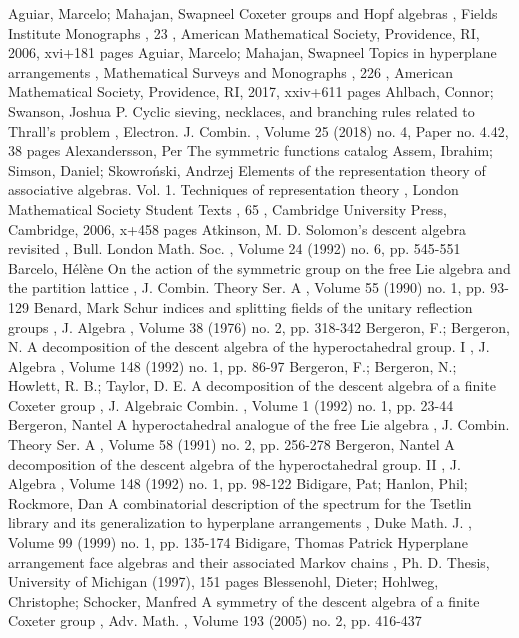  Aguiar, Marcelo; Mahajan, Swapneel Coxeter groups and Hopf algebras , Fields Institute Monographs , 23 , American Mathematical Society, Providence, RI, 2006, xvi+181 pages
 Aguiar, Marcelo; Mahajan, Swapneel Topics in hyperplane arrangements , Mathematical Surveys and Monographs , 226 , American Mathematical Society, Providence, RI, 2017, xxiv+611 pages
 Ahlbach, Connor; Swanson, Joshua P. Cyclic sieving, necklaces, and branching rules related to Thrall’s problem , Electron. J. Combin. , Volume 25 (2018) no. 4, Paper no. 4.42, 38 pages
 Alexandersson, Per The symmetric functions catalog
 Assem, Ibrahim; Simson, Daniel; Skowroński, Andrzej Elements of the representation theory of associative algebras. Vol. 1. Techniques of representation theory , London Mathematical Society Student Texts , 65 , Cambridge University Press, Cambridge, 2006, x+458 pages
 Atkinson, M. D. Solomon’s descent algebra revisited , Bull. London Math. Soc. , Volume 24 (1992) no. 6, pp. 545-551
 Barcelo, Hélène On the action of the symmetric group on the free Lie algebra and the partition lattice , J. Combin. Theory Ser. A , Volume 55 (1990) no. 1, pp. 93-129
 Benard, Mark Schur indices and splitting fields of the unitary reflection groups , J. Algebra , Volume 38 (1976) no. 2, pp. 318-342
 Bergeron, F.; Bergeron, N. A decomposition of the descent algebra of the hyperoctahedral group. I , J. Algebra , Volume 148 (1992) no. 1, pp. 86-97
 Bergeron, F.; Bergeron, N.; Howlett, R. B.; Taylor, D. E. A decomposition of the descent algebra of a finite Coxeter group , J. Algebraic Combin. , Volume 1 (1992) no. 1, pp. 23-44
 Bergeron, Nantel A hyperoctahedral analogue of the free Lie algebra , J. Combin. Theory Ser. A , Volume 58 (1991) no. 2, pp. 256-278
 Bergeron, Nantel A decomposition of the descent algebra of the hyperoctahedral group. II , J. Algebra , Volume 148 (1992) no. 1, pp. 98-122
 Bidigare, Pat; Hanlon, Phil; Rockmore, Dan A combinatorial description of the spectrum for the Tsetlin library and its generalization to hyperplane arrangements , Duke Math. J. , Volume 99 (1999) no. 1, pp. 135-174
 Bidigare, Thomas Patrick Hyperplane arrangement face algebras and their associated Markov chains , Ph. D. Thesis, University of Michigan (1997), 151 pages
 Blessenohl, Dieter; Hohlweg, Christophe; Schocker, Manfred A symmetry of the descent algebra of a finite Coxeter group , Adv. Math. , Volume 193 (2005) no. 2, pp. 416-437
